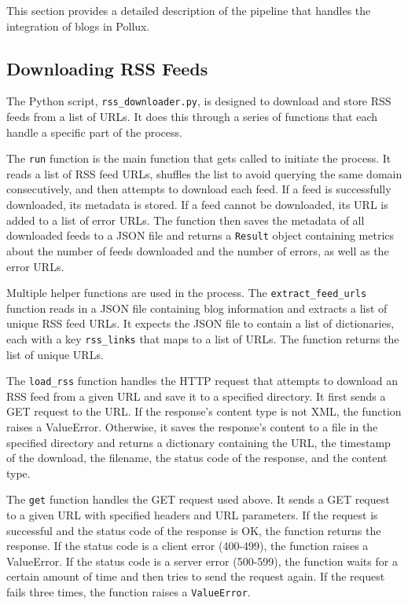 \documentclass{article}
\begin{document}
This section provides a detailed description of the pipeline that handles the integration of blogs in Pollux.

\subsection{Downloading RSS Feeds}

The Python script, \texttt{rss\_downloader.py}, is designed to download and store RSS feeds from a list of URLs. It does this through a series of functions that each handle a specific part of the process.

The \texttt{run} function is the main function that gets called to initiate the process. It reads a list of RSS feed URLs, shuffles the list to avoid querying the same domain consecutively, and then attempts to download each feed. If a feed is successfully downloaded, its metadata is stored. If a feed cannot be downloaded, its URL is added to a list of error URLs. The function then saves the metadata of all downloaded feeds to a JSON file and returns a \texttt{Result} object containing metrics about the number of feeds downloaded and the number of errors, as well as the error URLs.

Multiple helper functions are used in the process. The \texttt{extract\_feed\_urls} function reads in a JSON file containing blog information and extracts a list of unique RSS feed URLs. It expects the JSON file to contain a list of dictionaries, each with a key \texttt{rss\_links} that maps to a list of URLs. The function returns the list of unique URLs.

The \texttt{load\_rss} function handles the HTTP request that attempts to download an RSS feed from a given URL and save it to a specified directory. It first sends a GET request to the URL. If the response's content type is not XML, the function raises a ValueError. Otherwise, it saves the response's content to a file in the specified directory and returns a dictionary containing the URL, the timestamp of the download, the filename, the status code of the response, and the content type.

The \texttt{get} function handles the GET request used above. It sends a GET request to a given URL with specified headers and URL parameters. If the request is successful and the status code of the response is OK, the function returns the response. If the status code is a client error (400-499), the function raises a ValueError. If the status code is a server error (500-599), the function waits for a certain amount of time and then tries to send the request again. If the request fails three times, the function raises a \texttt{ValueError}.
\end{document}
